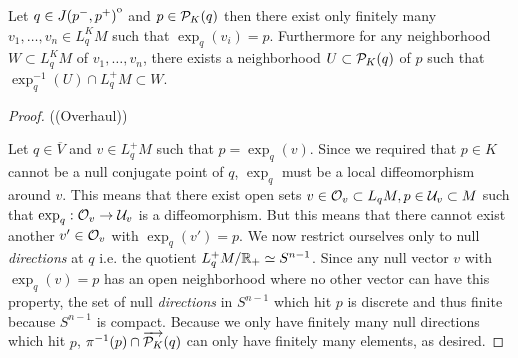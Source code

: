 \begin{lemma}\label{lem:finitevecs}
    Let $q\in {\kern0ptJ(p^-,p^+)}^{\mathrm{o}}$ and $p\in \mathcal{P}_K(q)$ then there exist only finitely many $v_1,\dots,v_n\in L^K_qM$ such that $\exp_q(v_i)=p$. Furthermore for any neighborhood $W\subset L^K_qM$ of $v_1,\dots,v_n$, there exists a neighborhood $U\subset \mathcal{P}_K(q)$ of $p$ such that $\exp^{-1}_q(U) \cap L^+_qM \subset W$. 
\end{lemma}
\begin{proof}
    ((Overhaul))

    Let $q\in \overline{V}$ and $v\in L^+_qM$ such that $p=\exp_q(v)$. Since we required that $p\in K$ cannot be a null conjugate point of $q$, $\exp_q$ must be a local diffeomorphism around $v$. This means that there exist open sets $v\in\mathcal{O}_v\subset L_qM, p\in \mathcal{U}_v\subset M$ such that $\exp_q:\mathcal{O}_v\to \mathcal{U}_v$ is a diffeomorphism. But this means that there cannot exist another $v'\in \mathcal{O}_v$ with $\exp_q(v')=p$. We now restrict ourselves only to null \emph{directions} at $q$ i.e. the quotient $L^+_qM/\mathbb{R}_+ \simeq S^{n-1}$. Since any null vector $v$ with $\exp_q(v)=p$ has an open neighborhood where no other vector can have this property, the set of null \emph{directions} in $S^{n-1}$ which hit $p$ is discrete and thus finite because $S^{n-1}$ is compact. Because we only have finitely many null directions which hit $p$, $\pi^{-1}(p)\cap \overrightarrow{\mathcal{P}_K}(q)$ can only have finitely many elements, as desired.
\end{proof}


